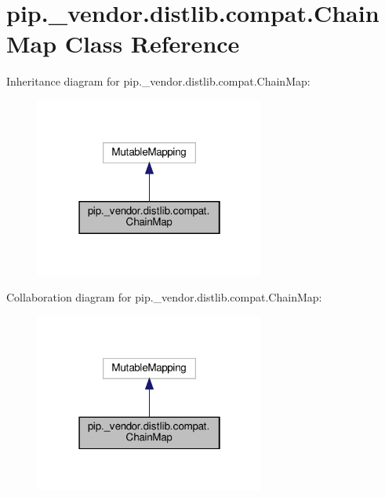 \hypertarget{classpip_1_1__vendor_1_1distlib_1_1compat_1_1ChainMap}{}\section{pip.\+\_\+vendor.\+distlib.\+compat.\+Chain\+Map Class Reference}
\label{classpip_1_1__vendor_1_1distlib_1_1compat_1_1ChainMap}


Inheritance diagram for pip.\+\_\+vendor.\+distlib.\+compat.\+Chain\+Map\+:
\nopagebreak
\begin{figure}[H]
\begin{center}
\leavevmode
\includegraphics[width=214pt]{classpip_1_1__vendor_1_1distlib_1_1compat_1_1ChainMap__inherit__graph}
\end{center}
\end{figure}


Collaboration diagram for pip.\+\_\+vendor.\+distlib.\+compat.\+Chain\+Map\+:
\nopagebreak
\begin{figure}[H]
\begin{center}
\leavevmode
\includegraphics[width=214pt]{classpip_1_1__vendor_1_1distlib_1_1compat_1_1ChainMap__coll__graph}
\end{center}
\end{figure}
